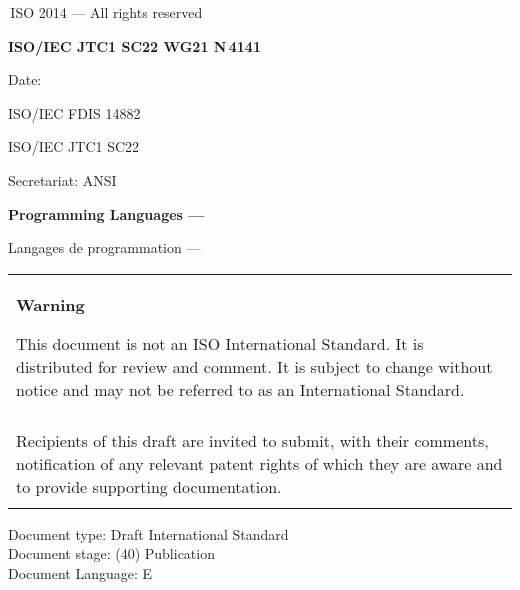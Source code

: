 

\thispagestyle{empty}
{\raisebox{.35ex}{\smaller\copyright}}\,ISO 2014 --- All rights reserved
\vspace{2ex}

\begin{flushright}
\textbf{ISO/IEC JTC1 SC22 WG21 N\,\LARGE4141}

Date: \reldate

ISO/IEC FDIS 14882

ISO/IEC JTC1 SC22

Secretariat: ANSI

\end{flushright}

\vfill

\textbf{\LARGE Programming Languages --- \Cpp}

Langages de programmation --- \Cpp

\vfill

\begin{tabular}{|p{\hsize}|}
\hline
\begin{center}
\textbf{Warning}
\end{center}

\vspace{2ex}

This document is not an ISO International Standard. It is distributed
for review and comment. It is subject to change without notice and may
not be referred to as an International Standard.\\\\

Recipients of this draft are invited to submit, with their comments,
notification of any relevant patent rights of which they are aware
and to provide supporting documentation.\\\\
\hline
\end{tabular}

\vfill
\noindent
Document type: Draft International Standard\\
Document stage: (40) Publication\\
Document Language: E
\pagebreak

\thispagestyle{cpppage}

